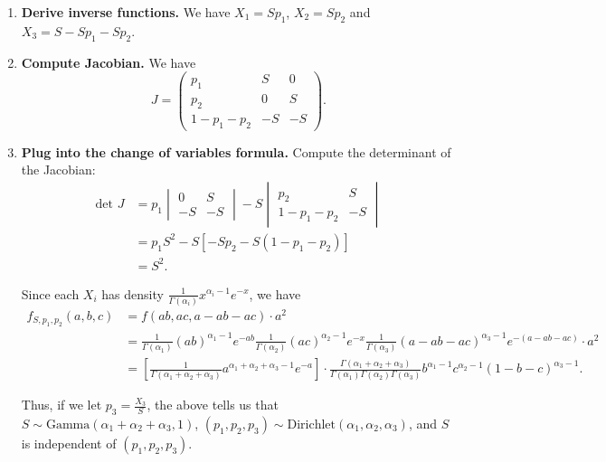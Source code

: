 \documentclass{article}
\newcommand{\dis}{\displaystyle}
\begin{document}
\begin{enumerate}
\item \textbf{Derive inverse functions.} We have $X_1 = S p_1$, $X_2 = S p_2$ and $X_3 = S - S p_1 - S p_2$.

\item \textbf{Compute Jacobian.} We have
\begin{equation*}
J = \begin{pmatrix} p_1 & S & 0 \\ p_2 & 0 & S \\ 1 - p_1 - p_2 & -S & -S  \end{pmatrix}.
\end{equation*}

\item \textbf{Plug into the change of variables formula.} Compute the determinant of the Jacobian:
\begin{align*}
\text{det } J &= p_1 \begin{vmatrix} 0 & S \\ -S & -S \end{vmatrix} - S \begin{vmatrix} p_2 & S \\ 1-p_1-p_2 & -S \end{vmatrix} \\ 
&= p_1 S^2 - S [- Sp_2 - S(1 - p_1 - p_2)] \\ 
&= S^2.
\end{align*}


Since each $X_i$ has density $\dis\frac{1}{\Gamma(\alpha_i)} x^{\alpha_i - 1} e^{-x}$, we have
\begin{align*}
f_{S, p_1, p_2} (a,b,c) &= f(ab, ac, a-ab-ac) \cdot a^2 \\ 
&= \frac{1}{\Gamma(\alpha_1)} (ab)^{\alpha_1 - 1} e^{-ab} \frac{1}{\Gamma(\alpha_2)} (ac)^{\alpha_2 - 1} e^{-x} \frac{1}{\Gamma(\alpha_3)} (a - ab - ac)^{\alpha_3 - 1} e^{-(a - ab - ac)} \cdot a^2 \\ 
&= \left[ \frac{1}{\Gamma(\alpha_1 + \alpha_2 + \alpha_3)} a^{\alpha_1 + \alpha_2 + \alpha_3 - 1} e^{-a} \right] \cdot \frac{\Gamma(\alpha_1 + \alpha_2 + \alpha_3)}{\Gamma(\alpha_1)\Gamma(\alpha_2)\Gamma(\alpha_3)} b^{\alpha_1 - 1} c^{\alpha_2 - 1} (1-b-c)^{\alpha_3 - 1}.
\end{align*}

Thus, if we let $p_3 = \dis\frac{X_3}{S}$, the above tells us that $S \sim \text{Gamma}(\alpha_1 + \alpha_2 + \alpha_3, 1)$, $(p_1, p_2, p_3) \sim \text{Dirichlet}(\alpha_1, \alpha_2, \alpha_3)$, and $S$ is independent of $(p_1, p_2, p_3)$.

\end{enumerate}
\end{document}

